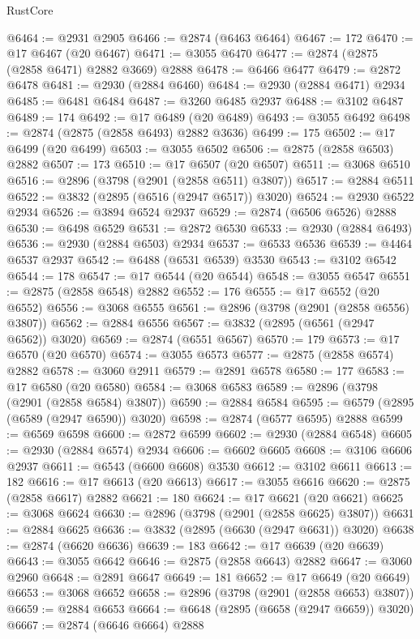 \begin{lexlean}{RustCore}
\begin{coremodule}
@6464 := @2931 @2905
@6466 := @2874 (@6463 @6464)
@6467 := 172
@6470 := @17 @6467 (@20 @6467)
@6471 := @3055 @6470
@6477 := @2874 (@2875 (@2858 @6471) @2882 @3669) @2888
@6478 := @6466 @6477
@6479 := @2872 @6478
@6481 := @2930 (@2884 @6460)
@6484 := @2930 (@2884 @6471) @2934
@6485 := @6481 @6484
@6487 := @3260 @6485 @2937
@6488 := @3102 @6487
@6489 := 174
@6492 := @17 @6489 (@20 @6489)
@6493 := @3055 @6492
@6498 := @2874 (@2875 (@2858 @6493) @2882 @3636)
@6499 := 175
@6502 := @17 @6499 (@20 @6499)
@6503 := @3055 @6502
@6506 := @2875 (@2858 @6503) @2882
@6507 := 173
@6510 := @17 @6507 (@20 @6507)
@6511 := @3068 @6510
@6516 := @2896 (@3798 (@2901 (@2858 @6511) @3807))
@6517 := @2884 @6511
@6522 := @3832 (@2895 (@6516 (@2947 @6517)) @3020)
@6524 := @2930 @6522 @2934
@6526 := @3894 @6524 @2937
@6529 := @2874 (@6506 @6526) @2888
@6530 := @6498 @6529
@6531 := @2872 @6530
@6533 := @2930 (@2884 @6493)
@6536 := @2930 (@2884 @6503) @2934
@6537 := @6533 @6536
@6539 := @4464 @6537 @2937
@6542 := @6488 (@6531 @6539) @3530
@6543 := @3102 @6542
@6544 := 178
@6547 := @17 @6544 (@20 @6544)
@6548 := @3055 @6547
@6551 := @2875 (@2858 @6548) @2882
@6552 := 176
@6555 := @17 @6552 (@20 @6552)
@6556 := @3068 @6555
@6561 := @2896 (@3798 (@2901 (@2858 @6556) @3807))
@6562 := @2884 @6556
@6567 := @3832 (@2895 (@6561 (@2947 @6562)) @3020)
@6569 := @2874 (@6551 @6567)
@6570 := 179
@6573 := @17 @6570 (@20 @6570)
@6574 := @3055 @6573
@6577 := @2875 (@2858 @6574) @2882
@6578 := @3060 @2911
@6579 := @2891 @6578
@6580 := 177
@6583 := @17 @6580 (@20 @6580)
@6584 := @3068 @6583
@6589 := @2896 (@3798 (@2901 (@2858 @6584) @3807))
@6590 := @2884 @6584
@6595 := @6579 (@2895 (@6589 (@2947 @6590)) @3020)
@6598 := @2874 (@6577 @6595) @2888
@6599 := @6569 @6598
@6600 := @2872 @6599
@6602 := @2930 (@2884 @6548)
@6605 := @2930 (@2884 @6574) @2934
@6606 := @6602 @6605
@6608 := @3106 @6606 @2937
@6611 := @6543 (@6600 @6608) @3530
@6612 := @3102 @6611
@6613 := 182
@6616 := @17 @6613 (@20 @6613)
@6617 := @3055 @6616
@6620 := @2875 (@2858 @6617) @2882
@6621 := 180
@6624 := @17 @6621 (@20 @6621)
@6625 := @3068 @6624
@6630 := @2896 (@3798 (@2901 (@2858 @6625) @3807))
@6631 := @2884 @6625
@6636 := @3832 (@2895 (@6630 (@2947 @6631)) @3020)
@6638 := @2874 (@6620 @6636)
@6639 := 183
@6642 := @17 @6639 (@20 @6639)
@6643 := @3055 @6642
@6646 := @2875 (@2858 @6643) @2882
@6647 := @3060 @2960
@6648 := @2891 @6647
@6649 := 181
@6652 := @17 @6649 (@20 @6649)
@6653 := @3068 @6652
@6658 := @2896 (@3798 (@2901 (@2858 @6653) @3807))
@6659 := @2884 @6653
@6664 := @6648 (@2895 (@6658 (@2947 @6659)) @3020)
@6667 := @2874 (@6646 @6664) @2888

\end{coremodule}
\end{lexlean}
